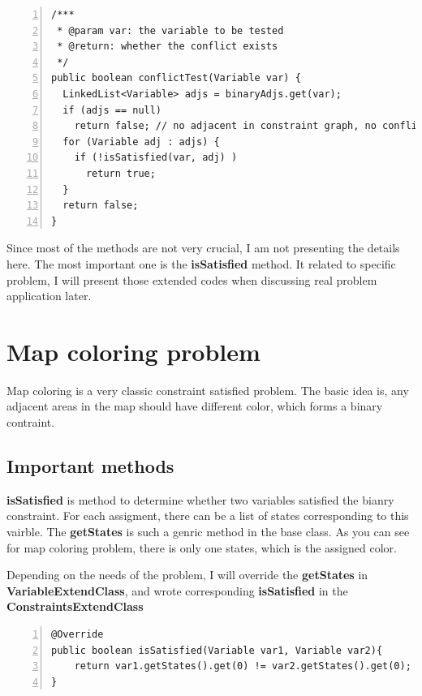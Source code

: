 \documentclass{article}
\begin{document}
\begin{lstlisting}[numbers=left, caption=Constraints.class]   
/***
 * @param var: the variable to be tested
 * @return: whether the conflict exists
 */
public boolean conflictTest(Variable var) {
  LinkedList<Variable> adjs = binaryAdjs.get(var);
  if (adjs == null)
    return false; // no adjacent in constraint graph, no conflict
  for (Variable adj : adjs) {
    if (!isSatisfied(var, adj) ) 
      return true;
  }
  return false;
}
\end{lstlisting}



Since most of the methods are not very crucial, I am not presenting the details here. The most important one is the \textbf{isSatisfied} method. It related to specific problem, I will present those extended codes when discussing real problem application later.
















\clearpage
\section{Map coloring problem}
Map coloring is a very classic constraint satisfied problem. The basic idea is, any adjacent areas in the map should have different color, which forms a binary contraint.

\subsection{Important methods}
\textbf{isSatisfied} is method to determine whether two variables satisfied the bianry constraint. For each assigment, there can be a list of states corresponding to this vairble. The \textbf{getStates} is such a genric method in the base class. As you can see for map coloring problem, there is only one states, which is the assigned color.

Depending on the needs of the problem, I will override the \textbf{getStates} in \textbf{VariableExtendClass}, and wrote corresponding \textbf{isSatisfied} in the \textbf{ConstraintsExtendClass}

\begin{lstlisting}[numbers=left, caption=ConstraintsMapColoring.class]   
@Override
public boolean isSatisfied(Variable var1, Variable var2){
    return var1.getStates().get(0) != var2.getStates().get(0);
}
\end{lstlisting}
\end{document}
